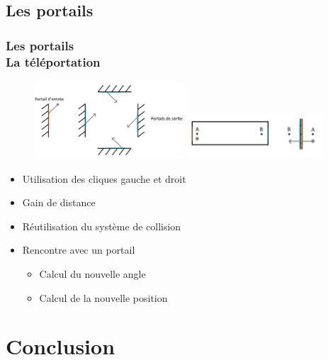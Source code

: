 \documentclass{beamer}
\begin{document}
\subsection{Les portails}

\begin{frame}
    \frametitle{Les portails \\
                \small La téléportation}
    \begin{figure}
        \includegraphics[width=0.5\textwidth]{images/portal2.png}
		\includegraphics[width=0.45\textwidth]{images/portal3.png}
	\end{figure}
    \begin{block}{}
        \begin{itemize}
            \item Utilisation des cliques gauche et droit
            \item Gain de distance
        \end{itemize}
    \end{block}
    \begin{block}{}
        \begin{itemize}
            \item Réutilisation du système de collision
            \item Rencontre avec un portail
            \begin{itemize}
                \item Calcul du nouvelle angle
                \item Calcul de la nouvelle position
            \end{itemize}
        \end{itemize}
    \end{block}
\end{frame}

\section{Conclusion}
\end{document}
